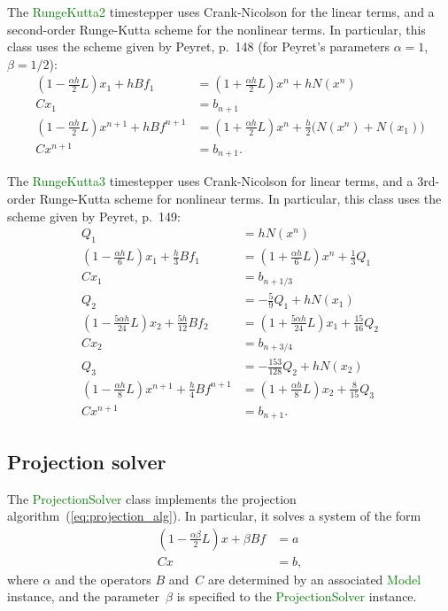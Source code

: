 \documentclass[11pt]{article}
\def\class#1{\textcolor{green}{\bf #1}}
\def\class#1{\textcolor{green}{\ttfamily\small #1}} %
\begin{document}
The \class{RungeKutta2} timestepper uses Crank-Nicolson for the linear terms, and a second-order Runge-Kutta scheme for the nonlinear terms.  In particular, this class uses the scheme given by Peyret, p.~148\cite{Peyret:2002} (for Peyret's parameters $\alpha=1$, $\beta=1/2$):
\begin{align}
	(1 - \frac{\alpha h}{2}L)x_1 + hBf_1 &= (1+\frac{\alpha h}{2}L)x^n + hN(x^n)\\
	Cx_1 &= b_{n+1}\\
	(1-\frac{\alpha h}{2}L)x^{n+1} + hBf^{n+1} &= (1 + \frac{\alpha h}{2}L)x^n + \frac{h}{2}\big(N(x^n) + N(x_1)\big)\\
	Cx^{n+1} &= b_{n+1}.
\end{align}
		
The \class{RungeKutta3} timestepper uses Crank-Nicolson for linear terms, and a 3rd-order Runge-Kutta scheme for nonlinear terms.  In particular, this class uses the scheme given by Peyret, p.~149\cite{Peyret:2002}:
\begin{align}
	Q_1 &= hN(x^n)\\
	(1-\frac{\alpha h}{6}L)x_1 + \frac{h}{3}Bf_1 &= (1+\frac{\alpha h}{6}L)x^n + \frac{1}{3}Q_1\\
	Cx_1 &= b_{n+1/3}\\
	Q_2 &= -\frac{5}{9} Q_1 + hN(x_1)\\
	(1-\frac{5\alpha h}{24}L)x_2 + \frac{5h}{12}Bf_2 &= (1+\frac{5\alpha h}{24}L)x_1 + \frac{15}{16}Q_2\\
	Cx_2 &= b_{n+3/4}\\
	Q_3 &= -\frac{153}{128} Q_2 + hN(x_2)\\
	(1-\frac{\alpha h}{8}L)x^{n+1} + \frac{h}{4}Bf^{n+1} &= (1+\frac{\alpha h}{8}L)x_2 + \frac{8}{15}Q_3\\
	Cx^{n+1} &= b_{n+1}.
\end{align}

\subsection{Projection solver}
\label{sub:projection_solver}
The \class{ProjectionSolver} class implements the projection algorithm~(\ref{eq:projection_alg}).  In particular, it solves a system of the form
\begin{align}
   (1 - \frac{\alpha\beta}{2}L )x + \beta B f &= a\\
   C x &= b,
\end{align}
where $\alpha$ and the operators $B$ and~$C$ are determined by an associated \class{Model} instance, and the parameter~$\beta$ is specified to the \class{ProjectionSolver} instance.
\end{document}
